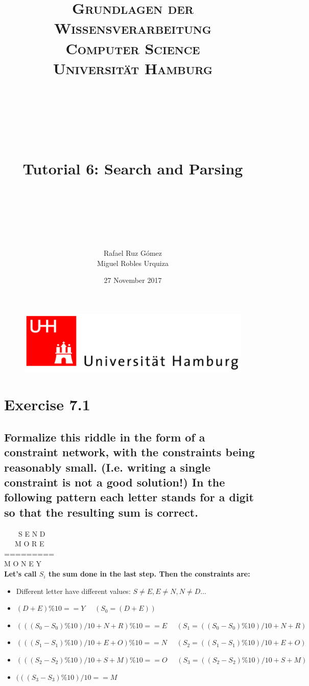 \documentclass[paper=a4, fontsize=11pt]{scrartcl} %
\title{	
\normalfont \normalsize 
\textsc{\textbf{Grundlagen der Wissensverarbeitung} \\ Computer Science \\ Universität Hamburg} \\ [25pt] %
~\\
~\\
~\\
\horrule{0.5pt} \\[0.4cm] %
\Huge Tutorial 6: Search and Parsing \\ %
\horrule{2pt} \\[0.5cm] %
~\\
~\\
}
\author{Rafael Ruz Gómez\\Miguel Robles Urquiza} %
\date{\normalsize 27 November 2017} %
\numberwithin{equation}{section} %
\numberwithin{figure}{section} %
\numberwithin{table}{section} %
\begin{document}
\maketitle %

\begin{figure}
	\centering
	\includegraphics[scale=0.8]{logo_uni_hamburg.png}
\end{figure}

\newpage %





\section*{Exercise 7.1}

\subsection*{Formalize this riddle in the form of a constraint network, with the constraints being reasonably small. (I.e. writing a single constraint is not a good solution!) In the following pattern each letter stands for a digit so that the resulting sum is correct.}

\ \ \ \ S E N D\\

\ \ \ M O R E\\
=========\\
M O N E Y\\


\textbf{Let's call $S_i$ the sum done in the last step. Then the constraints are:}
\begin{itemize}
	\item Different letter have different values: $S \neq E , E \neq N , N \neq D...$
	\item $(D + E) \% 10 == Y \ \ \ \ \ \ ( S_0 = (D + E) )$
	\item $ (((S_0 - S_0) \% 10) / 10 + N + R) \% 10 == E \ \ \ \ \ \ ( S_1 = ((S_0 - S_0) \% 10) / 10 + N + R ) $
	\item $ (((S_1 - S_1) \% 10) / 10 + E + O) \% 10 == N \ \ \ \ \ \ ( S_2 = ((S_1 - S_1) \% 10) / 10 + E + O) $
	\item $ (((S_2 - S_2) \% 10) / 10 + S + M) \% 10 == O \ \ \ \ \ \ ( S_3 = ((S_2 - S_2) \% 10) / 10 + S + M) $
	\item $ (((S_3 - S_3) \% 10) / 10 == M $
\end{itemize}
\end{document}
